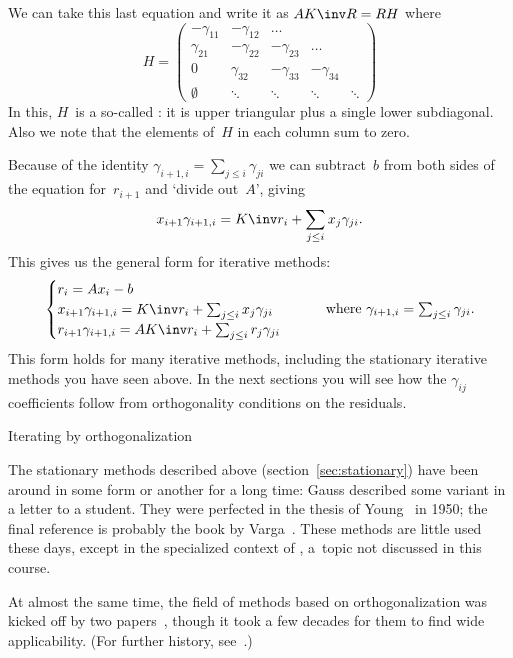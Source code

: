 We can take this last equation and write it as $AK\inv R=RH$ where
\[ H=
\begin{pmatrix}
  -\gamma_{11}&-\gamma_{12}&\ldots\\
  \gamma_{21}&-\gamma_{22}&-\gamma_{23}&\ldots\\
  0&\gamma_{32}&-\gamma_{33}&-\gamma_{34}\\
  \emptyset&\ddots&\ddots&\ddots&\ddots
\end{pmatrix}
\]
In this, $H$~is a so-called : it is upper
triangular plus a single lower subdiagonal. Also we note that the
elements of~$H$ in each column sum to zero.

Because of the identity $\gamma_{i+1,i}=\sum_{j\leq i}\gamma_{ji}$ we
can subtract~$b$ from both sides of the equation for~$r_{i+1}$ and
`divide out~$A$', giving
\[
  x_{i+1}\gamma_{i+1,i}=K\inv r_i+\sum_{j\leq i} x_j\gamma_{ji}.
\]
This gives us the general form for iterative methods:
\begin{equation}
  \begin{cases}
    r_i = Ax_i-b\\
    x_{i+1}\gamma_{i+1,i}=K\inv r_i+\sum_{j\leq i} x_j\gamma_{ji}\\
    r_{i+1}\gamma_{i+1,i}=AK\inv r_i+\sum_{j\leq i} r_j\gamma_{ji}
  \end{cases}\qquad
  \hbox{where $\gamma_{i+1,i}=\sum_{j\leq i}\gamma_{ji}$}.
  \label{eq:general-xr-hessenberg}
\end{equation}
This form holds for many iterative methods, including the stationary
iterative methods you have seen above. In the next sections you will
see how the $\gamma_{ij}$ coefficients follow from orthogonality
conditions on the residuals.

 {Iterating by orthogonalization}
\label{sec:fom}

The stationary methods described above (section~\ref{sec:stationary})
have been around in some form or another for a long time: Gauss
described some variant in a letter to a student. They were perfected
in the thesis of Young~\cite{Young:thesis} in 1950; the final
reference is probably the book by
Varga~\cite{Varga:iterative-analysis}. These methods are little used
these days, except in the specialized context of 
, a~topic not discussed in this course.

At almost the same time, the
field of methods based on orthogonalization was kicked off by two
papers~\cite{Lanczos1952:solution_of_systems,HestenesStiefel1952:cg},
though it took a few decades for them to find wide applicability. (For
further history, see~\cite{GolubOleary:cg-history}.)

